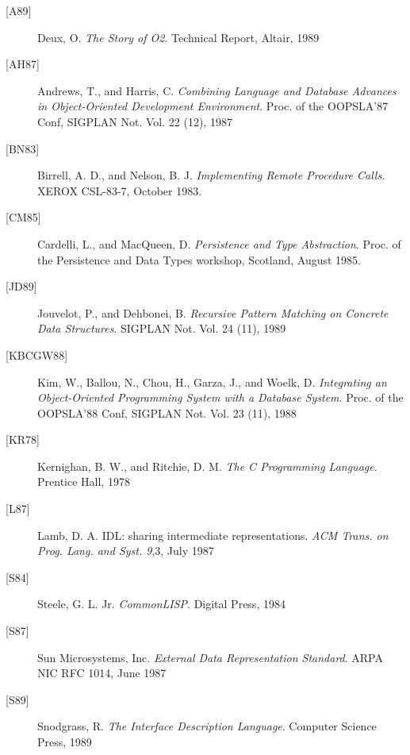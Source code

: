 \begin{description}
\item[\mbox{[A89]}]
        Deux, O. {\em The Story of O2}. Technical Report, Altair, 1989
\item[\mbox{[AH87]}]
        Andrews, T., and Harris, C. {\em Combining Language and Database
Advances in Object-Oriented Development Environment}.
Proc. of the OOPSLA'87 Conf, SIGPLAN Not. Vol. 22 (12), 1987
\item[\mbox{[BN83]}]
        Birrell, A. D., and Nelson, B. J. {\em Implementing Remote
Procedure Calls}. XEROX CSL-83-7, October 1983.
\item[\mbox{[CM85]}]
        Cardelli, L., and MacQueen, D. {\em Persistence and Type
Abstraction}. Proc. of the Persistence and Data Types workshop,
Scotland, August 1985.
\item[\mbox{[JD89]}]
        Jouvelot, P., and Dehbonei, B. {\em Recursive Pattern Matching
on Concrete Data Structures}. SIGPLAN Not. Vol. 24 (11), 1989
\item[\mbox{[KBCGW88]}]
        Kim, W., Ballou, N., Chou, H., Garza, J., and  Woelk, D. {\em
Integrating an Object-Oriented Programming System with a Database
System}. Proc. of the OOPSLA'88 Conf, SIGPLAN Not. Vol. 23 (11), 1988
\item[\mbox{[KR78]}]
        Kernighan, B. W., and Ritchie, D. M. {\em The C Programming
Language}. Prentice Hall, 1978
\item[\mbox{[L87]}]
        Lamb, D. A. IDL: sharing intermediate representations. {\em ACM
Trans. on Prog. Lang. and Syst. 9},3, July 1987
\item[\mbox{[S84]}]
        Steele, G. L. Jr. {\em CommonLISP}. Digital Press, 1984
\item[\mbox{[S87]}]
        Sun Microsystems, Inc. {\em External Data Representation
Standard}.  ARPA NIC RFC 1014, June 1987
\item[\mbox{[S89]}]
        Snodgrass, R. {\em The Interface Description Language}. Computer
Science Press, 1989
\end{description}


